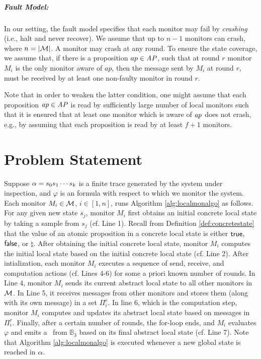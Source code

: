\subparagraph{Fault Model:} In our setting, the fault model specifies that each 
monitor may fail by {\em crashing} (i.e., halt and never recover). We assume 
that up to $n-1$ monitors can crash, where $n = |\mathcal{M}|$. A monitor may 
crash at any round. To ensure the state coverage, we assume that, if there is a 
proposition $ap \in \mathit{AP}$, such that at round $r$ monitor $M_i$ is the only 
monitor aware of $ap$, then the message sent by $M_i$ at round $r$, must be 
received by at least one non-faulty monitor in round $r$. 

Note that in order to weaken the latter condition, one might assume that each proposition $\mathit{ap} \in \mathit{AP}$ is read by sufficiently large number of local monitors such that it is ensured that at least one monitor which is aware of $\mathit{ap}$ does not crash, e.g., by assuming that each proposition is read by at least $f+1$ monitors.


\section{Problem Statement}
\label{sec:PS}

Suppose $\alpha = s_0s_1\cdots s_k$ is a finite trace 
generated by the system under inspection, and $\varphi$ is an \LTL formula with 
respect to which we monitor the system. Each monitor $M_i \in \mathcal{M}$, $i \in 
[1, n]$, runs Algorithm \ref{alg:localmonalgo} as follows. For any given new 
state $s_j$, monitor $M_i$ first obtains an initial concrete local state by 
taking a sample from $s_j$ (cf. Line 1). Recall from Definition 
\ref{def:concretestate} that the value of an atomic proposition in a 
concrete local state is either $\mathsf{true}$, $\mathsf{false}$, or $\natural$. After obtaining 
the initial concrete local state, monitor $M_i$ computes the initial local 
state based on the initial concrete local state (cf. Line 2). After 
intialization, each monitor $M_i$ executes a sequence of send, receive, and 
computation actions (cf. Lines 4-6) for some a priori known number of rounds.  
In Line 4, monitor $M_i$ sends its current abstract local state to all other 
monitors in $\mathcal{M}$. In Line 5, it receives messages from other monitors and 
stores them (along with its own message) in a set $\Pi_i^r$. In line 6, which is 
the computation step, monitor $M_i$ computes and updates its abstract local 
state based on messages in $\Pi_i^r$. Finally, after a certain number of rounds, 
the for-loop ends, and $M_i$ evaluates $\varphi$ and emits a \truthvalue~from 
$\mathbb{B}_3$ based on its final abstract local state (cf. Line 7). Note that 
Algorithm \ref{alg:localmonalgo} is executed whenever a new global state is 
reached in $\alpha$. 

